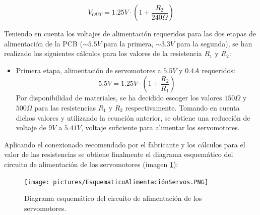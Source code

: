 \begin{equation}
    V_{OUT} = 1.25V \cdot \left( 1 + \frac{R_2}{240\Omega}\right) 
    \label{eq:funcional}
\end{equation}

Teniendo en cuenta los voltajes de alimentación requeridos para las dos etapas de alimentación de la \ac{PCB} ($\sim 5.5V$ para la primera, $\sim 3.3V$ para la segunda), se han realizado los siguientes cálculos para los valores de la resistencia $R_1$ y $R_2$:
\begin{itemize}
    \item Primera etapa, alimentación de servomotores a $5.5V$ y $0.4A$ requeridos:
    \begin{equation}
        5.5V = 1.25V \cdot \left( 1 + \frac{R_2}{R_1}\right) 
    \end{equation}
    Por disponibilidad de materiales, se ha decidido escoger los valores $150\Omega$ y $500\Omega$ para las resistencias $R_1$ y $R_2$ respectivamente. Tomando en cuenta dichos valores y utilizando la ecuación anterior, se obtiene una reducción de voltaje de $9V$ a $5.41V$, voltaje suficiente para alimentar los servomotores.
\end{itemize}

Aplicando el conexionado recomendado por el fabricante y los cálculos para el valor de las resistencias se obtiene finalmente el diagrama esquemático del circuito de alimentación de los servomotores (imagen \ref{fig:Esquematico_Alimentacion_Servos}):

\begin{figure}[H]
    \centering 
    \texttt{[image: pictures/EsquematicoAlimentaciónServos.PNG]}
    \caption{Diagrama esquemático del circuito de alimentación de los servomotores.}
    \label{fig:Esquematico_Alimentacion_Servos}
\end{figure}

